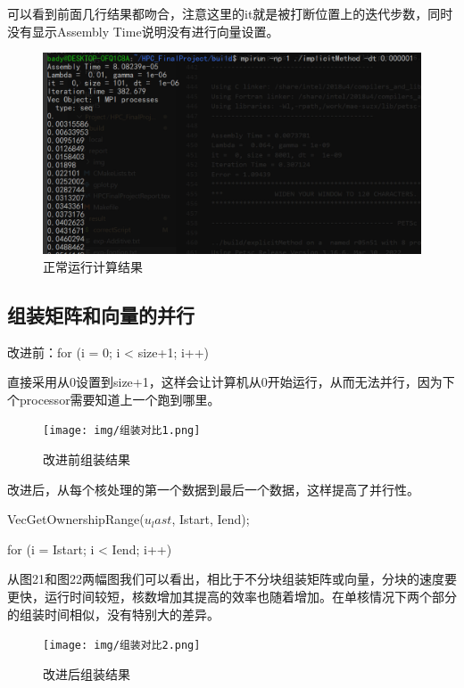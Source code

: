 \documentclass[10pt, a4paper]{article}
\begin{document}
可以看到前面几行结果都吻合，注意这里的it就是被打断位置上的迭代步数，同时没有显示Assembly Time说明没有进行向量设置。

\begin{figure}[!h]
\centering
\includegraphics[scale=0.3]{img/restart3.png}
\caption{正常运行计算结果}
\label{fig:1}
\end{figure}

\subsection{组装矩阵和向量的并行}
改进前：for (i = 0; i < size+1; i++)

直接采用从0设置到size+1，这样会让计算机从0开始运行，从而无法并行，因为下个processor需要知道上一个跑到哪里。

\begin{figure}[!h]
\centering
\texttt{[image: img/组装对比1.png]}
\caption{改进前组装结果}
\label{fig:1}
\end{figure}

改进后，从每个核处理的第一个数据到最后一个数据，这样提高了并行性。

    VecGetOwnershipRange($u_last$, Istart, Iend);
    
    for (i = Istart; i < Iend; i++)

从图21和图22两幅图我们可以看出，相比于不分块组装矩阵或向量，分块的速度要更快，运行时间较短，核数增加其提高的效率也随着增加。在单核情况下两个部分的组装时间相似，没有特别大的差异。

\begin{figure}[!h]
\centering
\texttt{[image: img/组装对比2.png]}
\caption{改进后组装结果}
\label{fig:1}
\end{figure}
\end{document}
